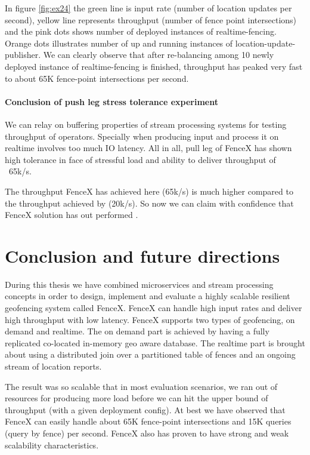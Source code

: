 \documentclass[a4]{report}
\begin{document}
    \clearpage

    In figure \ref{fig:ex24} the green line is input rate (number of location updates per second),
    yellow line represents throughput (number of fence point intersections) and the pink dots shows number of
    deployed instances of realtime-fencing.
    Orange dots illustrates number of up and running instances of location-update-publisher.
    We can clearly observe that after re-balancing among 10 newly deployed instance of realtime-fencing is finished,
    throughput has peaked very fast to about 65K fence-point intersections per second.

    \subsubsection{Conclusion of push leg stress tolerance experiment}
    We can relay on buffering properties of stream processing systems for testing throughput of operators.
    Specially when producing input and process it on realtime involves too much IO latency.
    All in all, pull leg of FenceX has shown high tolerance in face of stressful load and ability to deliver throughput of ~65k/s.

    The throughput FenceX has achieved here (65k/s) is much higher compared to the throughput achieved by
    \cite{Nechifor_Comnac_2013} (20k/s).
    So now we can claim with confidence that FenceX solution has out performed \cite{Nechifor_Comnac_2013}.

    \clearpage


    \chapter{Conclusion and future directions}
    During this thesis we have combined microservices and stream processing concepts in order to design, implement
    and evaluate a highly scalable resilient geofencing system called FenceX.
    FenceX can handle high input rates and deliver high throughput with low latency.
    FenceX supports two types of geofencing, on demand and realtime.
    The on demand part is achieved by having a fully replicated co-located in-memory geo aware database.
    The realtime part is brought about using a distributed join over a partitioned table of fences and an ongoing
    stream of location reports.

    The result was so scalable that in most evaluation scenarios, we ran out of resources for producing more load
    before we can hit the upper bound of throughput (with a given deployment config).
    At best we have observed that FenceX can easily handle about 65K fence-point intersections and 15K queries (query by
    fence) per second.
    FenceX also has proven to have strong and weak scalability characteristics.
\end{document}
